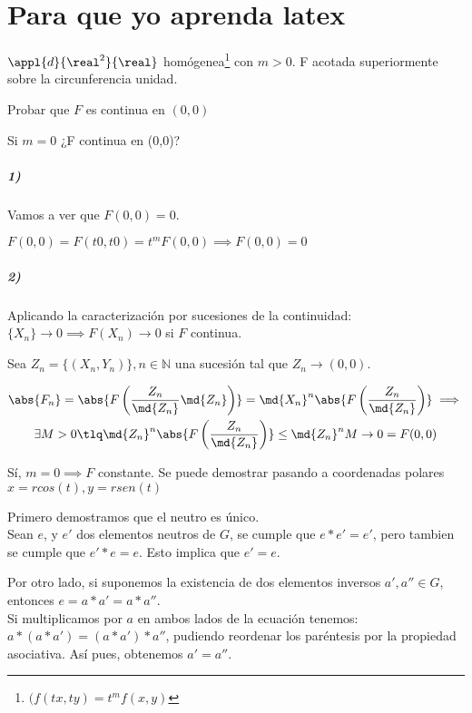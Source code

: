 \documentclass[nochap]{apuntes}
\begin{document}
\newpage
\section{Para que yo aprenda latex}

\begin{problem}[Ejemplo]

$\appl{d}{\real^2}{\real}$ homógenea\footnote{$(f(tx,ty) = t^mf(x,y)$} con $m>0$. F acotada superiormente sobre la circunferencia unidad.

\ppart Probar que $F$ es continua en $(0,0)$

\ppart Si $m=0$ ¿F continua en (0,0)?

\solution

\spart
\subparagraph{1)}
Vamos a ver que $F(0,0) = 0$.

$F(0,0) = F(t0,t0) = t^mF(0,0) \implies F(0,0) = 0$

\subparagraph{2)}
Aplicando la caracterización por sucesiones de la continuidad: $\{X_n\} \rightarrow 0 \implies F(X_n) \rightarrow 0$ si $F$ continua.

Sea $Z_n = \{(X_n,Y_n)\}, n\in \mathbb{N}$ una sucesión tal que $Z_n \rightarrow (0,0)$.

\begin{gather*}\abs{F_n} = \abs{F\left(\frac{Z_n}{\md{Z_n}}\md{Z_n}\right)} =
\md{X_n}^n \abs{F\left(\frac{Z_n}{\md{Z_n}}\right)} \implies \\
\exists M>0 \tlq \md{Z_n}^n \abs{F\left(\frac{Z_n}{\md{Z_n}}\right)} \leq \md{Z_n}^n M \rightarrow 0 = F(0,0)
\end{gather*}

\spart
Sí, $m=0 \implies F$ constante. Se puede demostrar pasando a coordenadas polares $x=rcos(t),y=rsen(t)$

\end{problem}

\begin{expla}
Primero demostramos que el neutro es único. \\
Sean $e$, y $e'$ dos elementos neutros de $G$, se cumple que $e\ast e'=e'$, pero tambien se cumple que $e'\ast e=e$. Esto implica que $e'=e$.

Por otro lado, si suponemos la existencia de dos elementos inversos $a',a''\in G$, entonces $e=a\ast a'=a\ast a''$. \\
Si multiplicamos por $a$ en ambos lados de la ecuación tenemos: $a\ast (a\ast a')=(a\ast a')\ast a''$, pudiendo reordenar los paréntesis por la 
propiedad asociativa. Así pues, obtenemos $a'=a''$.
\end{expla}
\end{document}
